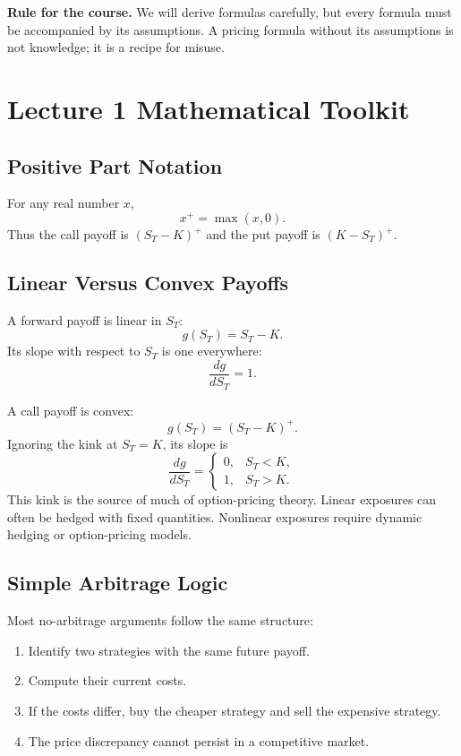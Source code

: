 \begin{boxF}
\textbf{Rule for the course.} We will derive formulas carefully, but every
formula must be accompanied by its assumptions. A pricing formula without its
assumptions is not knowledge; it is a recipe for misuse.
\end{boxF}

\section{Lecture 1 Mathematical Toolkit}

\subsection{Positive Part Notation}

For any real number $x$,
\[
    x^+ = \max(x,0).
\]
Thus the call payoff is $(S_T-K)^+$ and the put payoff is $(K-S_T)^+$.

\subsection{Linear Versus Convex Payoffs}

A forward payoff is linear in $S_T$:
\[
    g(S_T)=S_T-K.
\]
Its slope with respect to $S_T$ is one everywhere:
\[
    \frac{d g}{dS_T}=1.
\]

A call payoff is convex:
\[
    g(S_T)=(S_T-K)^+.
\]
Ignoring the kink at $S_T=K$, its slope is
\[
    \frac{d g}{dS_T}
    =
    \begin{cases}
    0, & S_T<K,\\
    1, & S_T>K.
    \end{cases}
\]
This kink is the source of much of option-pricing theory. Linear exposures can
often be hedged with fixed quantities. Nonlinear exposures require dynamic
hedging or option-pricing models.

\subsection{Simple Arbitrage Logic}

Most no-arbitrage arguments follow the same structure:
\begin{enumerate}
    \item Identify two strategies with the same future payoff.
    \item Compute their current costs.
    \item If the costs differ, buy the cheaper strategy and sell the expensive
    strategy.
    \item The price discrepancy cannot persist in a competitive market.
\end{enumerate}

